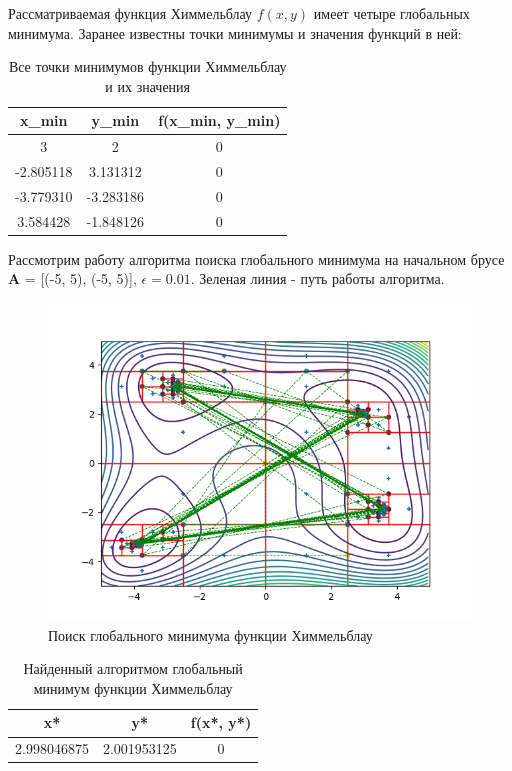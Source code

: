 Рассматриваемая функция Химмельблау $f(x, y)$ имеет четыре глобальных минимума. Заранее известны точки минимумы и значения функций в ней:

\begin{table}[H]
	\centering
	\begin{tabular}{| c | c | c |}
		\hline
		    x_{min} & y_{min} & f(x_{min}, y_{min}) \\
		\hline
		    3 & 2 & 0 \\
		    -2.805118 & 3.131312 & 0 \\
		    -3.779310 & -3.283186 & 0 \\
		    3.584428 & -1.848126 & 0 \\
   		\hline
	\end{tabular}
	\caption{Все точки минимумов функции Химмельблау и их значения}
\end{table}

Рассмотрим работу алгоритма поиска глобального минимума на начальном брусе \textbf{A} = [(-5, 5), (-5, 5)], $\epsilon = 0.01$. Зеленая линия - путь работы алгоритма.

\begin{figure}[H]
	\centering
		\includegraphics{task2/resources/Figure_4.png}
	\caption{Поиск глобального минимума функции Химмельблау}
	\label{w_pert}
\end{figure}

\begin{table}[H]
	\centering
	\begin{tabular}{| c | c | c |}
		\hline
		    x* & y* & f(x*, y*) \\
		\hline
		    2.998046875 & 2.001953125 & 0 \\
   		\hline
	\end{tabular}
	\caption{Найденный алгоритмом глобальный минимум функции Химмельблау}
\end{table}
